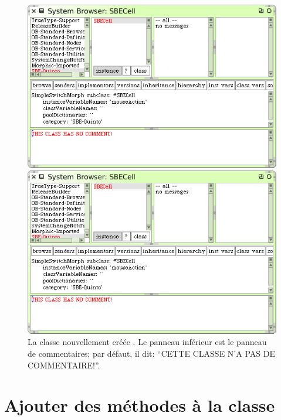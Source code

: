 \documentclass[a4paper,10pt,twoside]{book}
\begin{document}

\begin{figure}[h!t]
\ifluluelse
	{\centerline {\includegraphics[width=\textwidth]{SBECell}}}
	{\centerline {\includegraphics[scale=0.7]{SBECell}}}
\caption{La classe nouvellement créée . Le panneau
  inférieur est le panneau de commentaires; par défaut, il dit:
  ``CETTE CLASSE N'A PAS DE COMMENTAIRE!''.
\label{fig:SBECell}}
\end{figure}

\section{Ajouter des méthodes à la classe}
\end{document}
